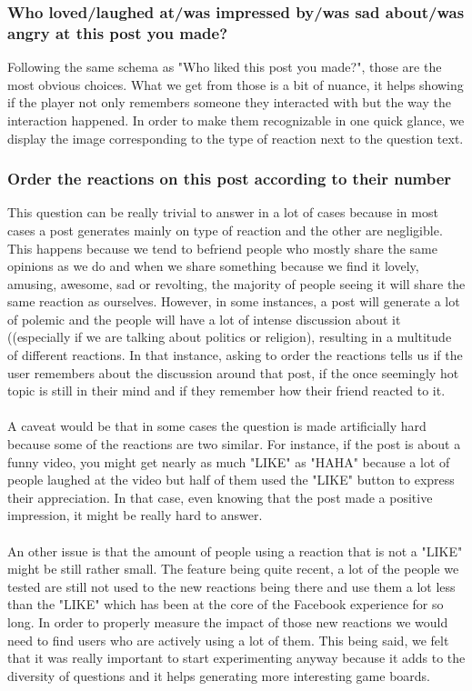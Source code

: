 \subsubsection{Who loved/laughed at/was impressed by/was sad about/was angry at this post you made?}
Following the same schema as "Who liked this post you made?", those are the most obvious choices. What we get from those is a bit of nuance, it helps showing if the player not only remembers someone they interacted with but the way the interaction happened. In order to make them  recognizable in one quick glance, we display the image corresponding to the type of reaction next to the question text. 
\subsubsection{Order the reactions on this post according to their number}
This question can be really trivial to answer in a lot of cases because in most cases a post generates mainly on type of reaction and the other are negligible. This happens because we tend to befriend people who mostly share the same opinions as we do and when we share something because we find it lovely, amusing, awesome, sad or revolting, the majority of people seeing it will share the same reaction as ourselves. However, in some instances, a post will generate a lot of polemic and the people will have a lot of intense discussion about it ((especially if we are talking about politics or religion), resulting in a multitude of different reactions. In that instance, asking to order the reactions tells us if the user remembers about the discussion around that post, if the once seemingly hot topic is still in their mind and if they remember how their friend reacted to it.\\\\
A caveat would be that in some cases the question is made artificially hard because some of the reactions are two similar. For instance, if the post is about a funny video, you might get nearly as much "LIKE" as "HAHA" because a lot of people laughed at the video but half of them used the "LIKE" button to express their appreciation. In that case, even knowing that the post made a positive impression, it might be really hard to answer.\\\\
An other issue is that the amount of people using a reaction that is not a "LIKE" might be still rather small. The feature being quite recent, a lot of the people we tested are still not used to the new reactions being there and use them a lot less than the "LIKE" which has been at the core of the Facebook experience for so long. In order to properly measure the impact of those new reactions we would need to find users who are actively using a lot of them. This being said, we felt that it was really important to start experimenting anyway because it adds to the diversity of questions and it helps generating more interesting game boards.\\
